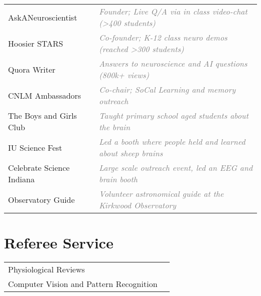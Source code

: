 \documentclass[10pt]{cooperCV2}
\begin{document}
\begin{longtable}{@{} l @{\extracolsep{\fill}}  l @{}}
	 
	AskANeuroscientist & \textcolor{grey}{ \textit{Founder; Live Q/A via in class video-chat (>400 students)}} \\
	 
	Hoosier STARS & \textcolor{grey}{ \textit{Co-founder; K-12 class neuro demos (reached >300 students)}} \\
	 
	Quora Writer & \textcolor{grey}{ \textit{Answers to neuroscience and AI questions (800k+ views)}} \\
	 
	CNLM Ambassadors & \textcolor{grey}{ \textit{Co-chair; SoCal Learning and memory outreach}} \\
	 
	The Boys and Girls Club & \textcolor{grey}{ \textit{Taught primary school aged students about the brain}} \\
	 
	IU Science Fest & \textcolor{grey}{ \textit{Led a booth where people held and learned about sheep brains}} \\
	 
	Celebrate Science Indiana & \textcolor{grey}{ \textit{Large scale outreach event, led an EEG and brain booth}} \\
	 
	Observatory Guide & \textcolor{grey}{ \textit{Volunteer astronomical guide at the Kirkwood Observatory}} \\
	
\end{longtable}






%	






\section{Referee Service}
\begin{longtable}{@{} l @{\extracolsep{\fill}}  l @{}}
 
Physiological Reviews & \\
 
Computer Vision and Pattern Recognition & \\

\end{longtable}
\end{document}
